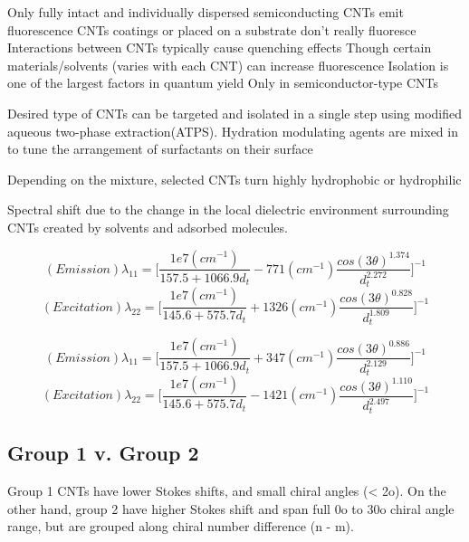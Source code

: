 Only fully intact and individually dispersed semiconducting CNTs emit fluorescence
CNTs coatings or placed on a substrate don’t really fluoresce
Interactions between CNTs typically cause quenching effects
Though certain materials/solvents (varies with each CNT) can increase fluorescence
Isolation is one of the largest factors in quantum yield
Only in semiconductor-type CNTs

Desired type of CNTs can be targeted and isolated in a single step using modified aqueous two-phase extraction(ATPS).
Hydration modulating agents are mixed in to tune the arrangement of surfactants on their surface

Depending on the mixture, selected CNTs turn highly hydrophobic or hydrophilic

Spectral shift due to the change in the local dielectric environment surrounding CNTs created by solvents and adsorbed molecules.\cite{turek}


\begin{equation}
	(Emission)\lambda_{11} = \Bigg[\frac{1e7(cm^{-1})}{157.5+1066.9d_t} - 771(cm^{-1})\frac{cos(3\theta)^{1.374}}{d_t^{2.272}} \Bigg]^{-1}
\end{equation}
\begin{equation}
	(Excitation)\lambda_{22} = \Bigg[\frac{1e7(cm^{-1})}{145.6+575.7d_t} + 1326(cm^{-1})\frac{cos(3\theta)^{0.828}}{d_t^{1.809}} \Bigg]^{-1}
\end{equation}

\begin{equation}
	(Emission)\lambda_{11} = \Bigg[\frac{1e7(cm^{-1})}{157.5+1066.9d_t} + 347(cm^{-1})\frac{cos(3\theta)^{0.886}}{d_t^{2.129}} \Bigg]^{-1}
\end{equation}
\begin{equation}
	(Excitation)\lambda_{22} = \Bigg[\frac{1e7(cm^{-1})}{145.6+575.7d_t} - 1421(cm^{-1})\frac{cos(3\theta)^{1.110}}{d_t^{2.497}} \Bigg]^{-1}
\end{equation}

\subsection{Group 1 v. Group 2}
Group 1 CNTs have lower Stokes shifts, and small chiral angles (< 2o).
On the other hand, group 2 have higher Stokes shift and span full 0o to 30o chiral angle range, but are grouped along chiral number difference (n - m).

